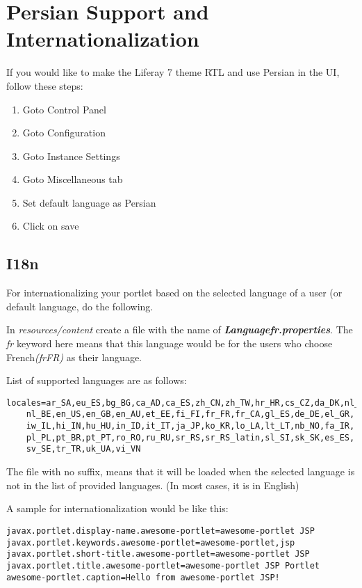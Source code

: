 \section{Persian Support and Internationalization}
If you would like to make the Liferay 7 theme RTL and use Persian in the UI, follow these steps:
\begin{enumerate}
    \item Goto Control Panel
    \item Goto Configuration
    \item Goto Instance Settings
    \item Goto Miscellaneous tab
    \item Set default language as Persian
    \item Click on save
\end{enumerate}

\subsection{I18n}
For internationalizing your portlet based on the selected language of a user (or default language, do the following.

In \textit{resources/content} create a file with the name of \textit{\textbf{Language\textunderscore fr.properties}}. The \textit{fr} keyword here means that this language would be for the users who choose French\textit{(fr\textunderscore FR)} as their language.

List of supported languages are as follows:

\lstset{language=bash}
\begin{lstlisting}[caption=Supported Languages]
locales=ar_SA,eu_ES,bg_BG,ca_AD,ca_ES,zh_CN,zh_TW,hr_HR,cs_CZ,da_DK,nl_NL,
    nl_BE,en_US,en_GB,en_AU,et_EE,fi_FI,fr_FR,fr_CA,gl_ES,de_DE,el_GR,
    iw_IL,hi_IN,hu_HU,in_ID,it_IT,ja_JP,ko_KR,lo_LA,lt_LT,nb_NO,fa_IR,
    pl_PL,pt_BR,pt_PT,ro_RO,ru_RU,sr_RS,sr_RS_latin,sl_SI,sk_SK,es_ES,
    sv_SE,tr_TR,uk_UA,vi_VN
\end{lstlisting}

The file with no suffix, means that it will be loaded when the selected language is not in the list of provided languages. (In most cases, it is in English)

A sample for internationalization would be like this:

\lstset{language=jsp}
\begin{lstlisting}[caption=Language.properties]
javax.portlet.display-name.awesome-portlet=awesome-portlet JSP
javax.portlet.keywords.awesome-portlet=awesome-portlet,jsp
javax.portlet.short-title.awesome-portlet=awesome-portlet JSP
javax.portlet.title.awesome-portlet=awesome-portlet JSP Portlet
awesome-portlet.caption=Hello from awesome-portlet JSP!
\end{lstlisting}

